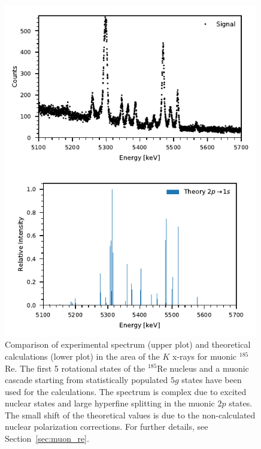 %
\begin{figure}%
\centering
\includegraphics[width=0.99\textwidth]{pics/comparison_21}
\caption{
Comparison of experimental spectrum (upper plot) and theoretical calculations (lower plot) in the area of the $K$ x-rays for muonic $^{185}$Re. The first 5 rotational states of the $^{185}$Re nucleus and a muonic cascade starting from statistically populated $5g$ states have been used for the calculations. The spectrum is complex due to excited nuclear states and large hyperfine splitting in the muonic $2p$ states. The small shift of the theoretical values is due to the non-calculated nuclear polarization corrections. For further details, see Section~\ref{sec:muon_re}.
}
\label{fig:re54_K}
\end{figure}%
%
%
%
\clearpage

